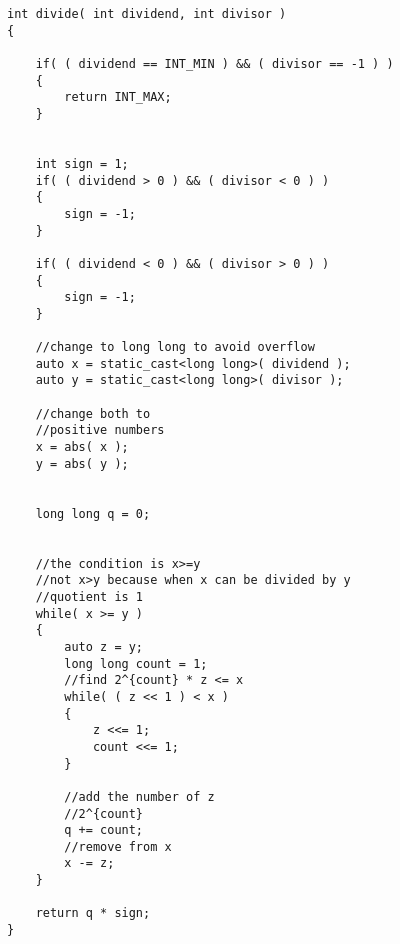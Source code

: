\setcounter{lstlisting}{0}
\begin{lstlisting}[style=customc, caption={Left Shift}]
int divide( int dividend, int divisor )
{

    if( ( dividend == INT_MIN ) && ( divisor == -1 ) )
    {
        return INT_MAX;
    }


    int sign = 1;
    if( ( dividend > 0 ) && ( divisor < 0 ) )
    {
        sign = -1;
    }

    if( ( dividend < 0 ) && ( divisor > 0 ) )
    {
        sign = -1;
    }

    //change to long long to avoid overflow
    auto x = static_cast<long long>( dividend );
    auto y = static_cast<long long>( divisor );

    //change both to
    //positive numbers
    x = abs( x );
    y = abs( y );


    long long q = 0;


    //the condition is x>=y
    //not x>y because when x can be divided by y
    //quotient is 1
    while( x >= y )
    {
        auto z = y;
        long long count = 1;
        //find 2^{count} * z <= x
        while( ( z << 1 ) < x )
        {
            z <<= 1;
            count <<= 1;
        }

        //add the number of z
        //2^{count}
        q += count;
        //remove from x
        x -= z;
    }

    return q * sign;
}

\end{lstlisting}
